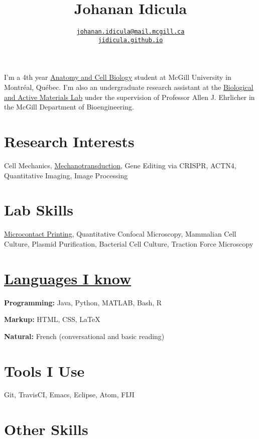 \documentclass[%
	12pt,%
	]
	{article}
\title{\textbf{Johanan Idicula}}
\author{\href{mailto:johanan.idicula@mail.mcgill.ca}{\tt{johanan.idicula@mail.mcgill.ca}} \\ \href{https://jidicula.github.io/}{\tt{jidicula.github.io}}}
\date{} %
\begin{document}
\pagestyle{fancy}
\setlength\headheight{14pt}

\maketitle
\thispagestyle{fancy}

I'm a 4th year \href{http://www.mcgill.ca/anatomy}{Anatomy and Cell Biology} student at McGill University in Montr\'eal, Qu\'ebec. I'm also an undergraduate research assistant at the \href{http://bam.lab.mcgill.ca/}{Biological and Active Materials Lab} under the supervision of Professor Allen J. Ehrlicher in the McGill Department of Bioengineering.

\section*{Research Interests}

Cell Mechanics, \href{http://bam.lab.mcgill.ca/project_pages/ACTN4_Mechanosensitivity.html}{Mechanotransduction}, Gene Editing via CRISPR, ACTN4, Quantitative Imaging, Image Processing

\section*{Lab Skills}

\href{https://jidicula.github.io/images/micropattern.jpg}{Microcontact Printing}, Quantitative Confocal Microscopy, Mammalian Cell Culture, Plasmid Purification, Bacterial Cell Culture, Traction Force Microscopy


\section*{\href{https://github.com/jidicula}{Languages I know}}

\textbf{Programming:} Java, Python, MATLAB, Bash, R

\textbf{Markup:} HTML, CSS, \LaTeX

\textbf{Natural:} French (conversational and basic reading)

\section*{Tools I Use}

Git, TravisCI, Emacs, Eclipse, Atom, FIJI

\section*{Other Skills}
\end{document}
